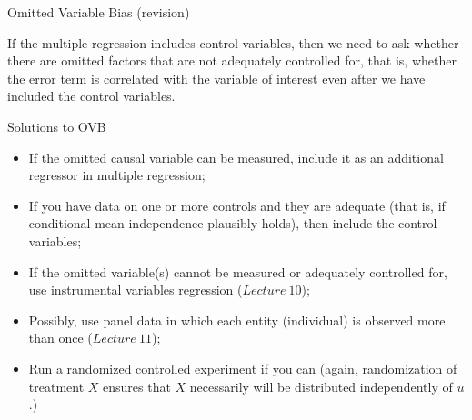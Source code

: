 \documentclass[notes,10pt, aspectratio=169]{beamer}
\begin{document}
\begin{frame}{Omitted Variable Bias (revision)}
\begin{center}
\begin{figure}
{

}
\end{figure}
\end{center}

If the multiple regression includes control variables, then we need to ask whether there are omitted factors that are not adequately controlled for, that is, whether the error term is correlated with the variable of interest even after we have included the control variables.
\end{frame}

\begin{frame}{Solutions to OVB}

\begin{itemize}
    \item If the omitted causal variable can be measured, include it as an additional regressor in multiple regression;\\[1em]
    \item If you have data on one or more controls and they are adequate (that is, if conditional mean independence plausibly holds), then include the control variables;\\[1em]
    \item If the omitted variable(s) cannot be measured or adequately controlled for, use instrumental variables regression ($Lecture~10$);\\[1em]
    \item Possibly, use panel data in which each entity (individual) is observed more than once ($Lecture~11$);\\[1em]
    \item Run a randomized controlled experiment if you can (again, randomization of treatment $X$ ensures that $X$ necessarily will be distributed independently of $u$.)
\end{itemize}
\end{frame}
\end{document}
